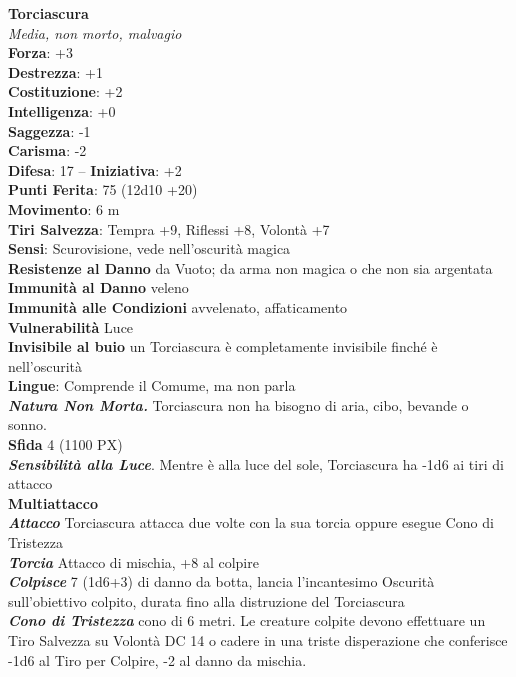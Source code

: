 \begin{multicols}{2}
	\medskip\textbf{Torciascura}\\
	\textit{Media, non morto, malvagio}\\
	\textbf{Forza}: +3\\
	\textbf{Destrezza}: +1\\
	\textbf{Costituzione}: +2\\
	\textbf{Intelligenza}: +0\\
	\textbf{Saggezza}: -1\\
	\textbf{Carisma}: -2\\
	\textbf{Difesa}: 17 -- \textbf{Iniziativa}: +2\\
	\textbf{Punti Ferita}: 75 (12d10 +20)\\
	\textbf{Movimento}: 6 m\\
	\textbf{Tiri Salvezza}: Tempra +9, Riflessi +8, Volontà +7 \\
	\textbf{Sensi}: Scurovisione, vede nell'oscurità magica\\
	\textbf{Resistenze al Danno} da Vuoto; da arma non magica o che non sia argentata\\
	\textbf{Immunità al Danno} veleno\\
	\textbf{Immunità alle Condizioni} avvelenato, affaticamento\\
	\textbf{Vulnerabilità} Luce\\
	\textbf{Invisibile al buio} un Torciascura è completamente invisibile finché è nell'oscurità\\
	\textbf{Lingue}: Comprende il Comume, ma non parla\\
	\textit{\textbf{Natura Non Morta.}} Torciascura non ha bisogno di aria, cibo, bevande o sonno.\\
	\textbf{Sfida} 4 (1100 PX)\\
	\textit{\textbf{Sensibilità alla Luce}}. Mentre è alla luce del sole, Torciascura ha -1d6 ai tiri di attacco\\
	\textbf{Multiattacco}\\
	\textit{\textbf{Attacco}} Torciascura attacca due volte con la sua torcia oppure esegue Cono di Tristezza\\
	\textit{\textbf{Torcia}} Attacco di mischia, +8 al colpire\\
	\textit{\textbf{Colpisce}} 7 (1d6+3) di danno da botta, lancia l'incantesimo Oscurità sull'obiettivo colpito, durata fino alla distruzione del Torciascura\\
	\textit{\textbf{Cono di Tristezza}} cono di 6 metri. Le creature colpite devono effettuare un Tiro Salvezza su Volontà DC 14 o cadere in una triste disperazione che conferisce -1d6 al Tiro per Colpire, -2 al danno da mischia.\\

\end{multicols}
